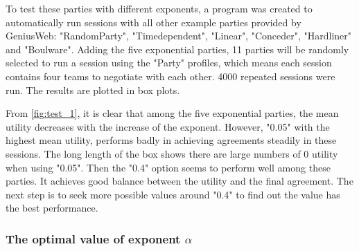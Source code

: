             To test these parties with different exponents, a program was created to automatically run sessions with all other example parties provided by GeniusWeb: "RandomParty", "Timedependent", "Linear", "Conceder", "Hardliner" and "Boulware". Adding the five exponential parties, 11 parties will be randomly selected to run a session using the "Party" profiles, which means each session contains four teams to negotiate with each other. 4000 repeated sessions were run. The results are plotted in box plots.\\

            From \autoref{fig:test_1}, it is clear that among the five exponential parties, the mean utility decreases with the increase of the exponent. However, "0.05" with the highest mean utility, performs badly in achieving agreements steadily in these sessions. The long length of the box shows there are large numbers of 0 utility when using "0.05". Then the "0.4" option seems to perform well among these parties. It achieves good balance between the utility and the final agreement. The next step is to seek more possible values around "0.4" to find out the value has the best performance.

        \subsubsection[The optimal value of exponent alpha]{The optimal value of exponent $\alpha$}

